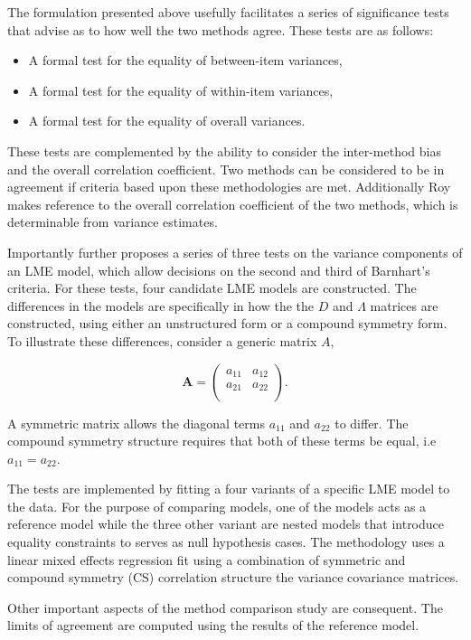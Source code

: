 \documentclass[12pt, a4paper]{report}
\theoremstyle{plain}
\theoremstyle{definition}
\theoremstyle{remark}
\begin{document}
The formulation presented above usefully facilitates a series of
significance tests that advise as to how well the two methods
agree. These tests are as follows:
\begin{itemize}
	\item A formal test for the equality of between-item variances,
	\item A formal test for the equality of within-item variances,
	\item A formal test for the equality of overall variances.
\end{itemize}
These tests are complemented by the ability to consider the inter-method bias and the overall correlation coefficient. Two methods can be considered to be in agreement if criteria based upon these methodologies are met. Additionally Roy makes reference to the overall correlation coefficient of the two methods, which is determinable from variance estimates.


Importantly \citet{ARoy2009} further proposes a series of three tests on the variance components of an LME model, which allow decisions on the second and third of Barnhart's criteria. For these tests, four candidate LME models are constructed. The differences in the models are specifically in how the the $D$ and $\Lambda$ matrices are constructed, using either an unstructured form or a compound symmetry form. To illustrate these differences, consider a generic matrix $A$,

\[
\boldsymbol{A} = \left( \begin{array}{cc}
a_{11} & a_{12}  \\
a_{21} & a_{22}  \\
\end{array}\right).
\]



A symmetric matrix allows the diagonal terms $a_{11}$ and $a_{22}$ to differ. The compound symmetry structure requires that both of these terms be equal, i.e $a_{11} = a_{22}$.

The tests are implemented by fitting a four variants of a specific LME model to the data. For the purpose of comparing models, one of the models acts as a reference model while the three other variant are nested models that introduce equality constraints to serves as null hypothesis cases. The methodology uses a linear mixed effects regression fit using a combination of symmetric and 
compound symmetry (CS) correlation structure the variance covariance matrices.

Other important aspects of the method comparison study are consequent. The limits of agreement are computed using the results of the reference model.
\end{document}
